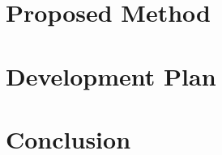 \documentclass[sigconf, screen]{acmart}
\begin{document}
\section{Proposed Method}
\label{sec:method}


\section{Development Plan}
\label{sec:plan}


\section{Conclusion}
\label{sec:conclusion}




\end{document}
